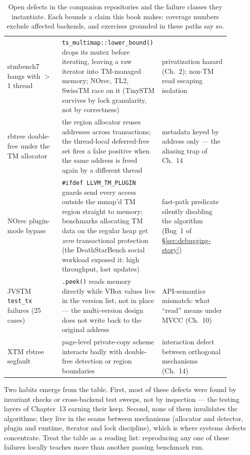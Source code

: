 \begin{table}[htbp]
\centering
\begin{tabular}{M{0.24\linewidth}M{0.36\linewidth}M{0.30\linewidth}}
\hline
{} &  &  \\
\hline
stmbench7 hangs with $>$1 thread & \texttt{ts\_multimap::lower\_bound()} drops its mutex before iterating, leaving a raw iterator into TM-managed memory; NOrec, TL2, SwissTM race on it (TinySTM survives by lock granularity, not by correctness) & privatization hazard (Ch.~2); non-TM read escaping isolation \\
rbtree double-free under the TM allocator & the region allocator reuses addresses across transactions; the thread-local deferred-free set fires a false positive when the same address is freed again by a different thread & metadata keyed by address only --- the aliasing trap of Ch.~14 \\
NOrec plugin-mode bypass & \texttt{\#ifdef LLVM\_TM\_PLUGIN} guards send every access outside the mmap'd TM region straight to memory; benchmarks allocating TM data on the regular heap get \emph{zero} transactional protection (the DeathStarBench social workload exposed it: high throughput, lost updates) & fast-path predicate silently disabling the algorithm (Bug~1 of \S\ref{sec:debugging-story}) \\
JVSTM \texttt{test\_tx} failures (25 cases) & \texttt{.peek()} reads memory directly while VBox values live in the version list, not in place --- the multi-version design does not write back to the original address & API-semantics mismatch: what ``read'' means under MVCC (Ch.~10) \\
XTM rbtree segfault & page-level private-copy scheme interacts badly with double-free detection or region boundaries & interaction defect between orthogonal mechanisms (Ch.~14) \\
\hline
\end{tabular}
\caption{Open defects in the companion repositories and the failure classes they instantiate. Each bounds a claim this book makes: coverage numbers exclude affected backends, and exercises grounded in these paths say so.}
\label{tab:companion-known-limits}
\end{table}

Two habits emerge from the table. First, most of these defects were found by
invariant checks or cross-backend test sweeps, not by inspection --- the
testing layers of Chapter~13 earning their keep. Second, none of them
invalidates the algorithms; they live in the seams between mechanisms
(allocator and detector, plugin and runtime, iterator and lock discipline),
which is where systems defects concentrate. Treat the table as a reading list:
reproducing any one of these failures locally teaches more than another
passing benchmark run.


